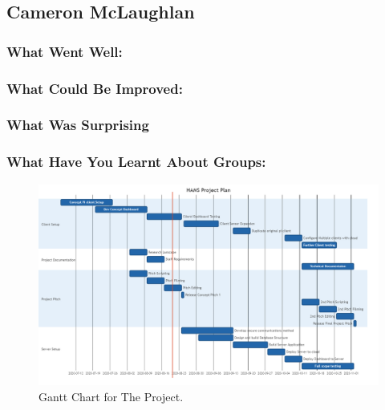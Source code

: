 \documentclass[11pt, oneside, a4paper, titlepage]{article}
\begin{document}
\subsection{Cameron McLaughlan}
\subsubsection{What Went Well:}


\subsubsection{What Could Be Improved:}


\subsubsection{What Was Surprising}


\subsubsection{What Have You Learnt About Groups:}


\newpage

\begin{figure}
\includegraphics[width=1\textwidth]{DiagramC}
\caption{Gantt Chart for The Project.}
\end{figure}
\end{document}
